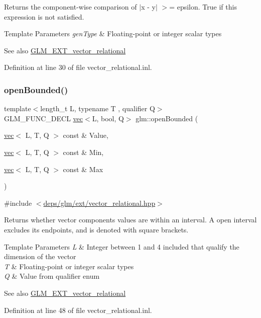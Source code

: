 Returns the component-\/wise comparison of $\vert$x -\/ y$\vert$ $>$= epsilon. True if this expression is not satisfied.


\begin{DoxyTemplParams}{Template Parameters}
{\em gen\+Type} & Floating-\/point or integer scalar types\\
\hline
\end{DoxyTemplParams}
\begin{DoxySeeAlso}{See also}
\hyperlink{group__ext__vector__relational}{G\+L\+M\+\_\+\+E\+X\+T\+\_\+vector\+\_\+relational} 
\end{DoxySeeAlso}


Definition at line 30 of file vector\+\_\+relational.\+inl.

\mbox{\label{group__ext__vector__relational_gafd303042ba2ba695bf53b2315f53f93f}} 
\subsubsection{\texorpdfstring{open\+Bounded()}{openBounded()}}
{\footnotesize\ttfamily template$<$length\+\_\+t L, typename T , qualifier Q$>$ \\
G\+L\+M\+\_\+\+F\+U\+N\+C\+\_\+\+D\+E\+CL \hyperlink{structglm_1_1vec}{vec}$<$L, bool, Q$>$ glm\+::open\+Bounded (\begin{DoxyParamCaption}\item[{\hyperlink{structglm_1_1vec}{vec}$<$ L, T, Q $>$ const \&}]{Value,  }\item[{\hyperlink{structglm_1_1vec}{vec}$<$ L, T, Q $>$ const \&}]{Min,  }\item[{\hyperlink{structglm_1_1vec}{vec}$<$ L, T, Q $>$ const \&}]{Max }\end{DoxyParamCaption})}



{\ttfamily \#include $<$\hyperlink{ext_2vector__relational_8hpp}{deps/glm/ext/vector\+\_\+relational.\+hpp}$>$}

Returns whether vector components values are within an interval. A open interval excludes its endpoints, and is denoted with square brackets.


\begin{DoxyTemplParams}{Template Parameters}
{\em L} & Integer between 1 and 4 included that qualify the dimension of the vector \\
\hline
{\em T} & Floating-\/point or integer scalar types \\
\hline
{\em Q} & Value from qualifier enum\\
\hline
\end{DoxyTemplParams}
\begin{DoxySeeAlso}{See also}
\hyperlink{group__ext__vector__relational}{G\+L\+M\+\_\+\+E\+X\+T\+\_\+vector\+\_\+relational} 
\end{DoxySeeAlso}


Definition at line 48 of file vector\+\_\+relational.\+inl.

